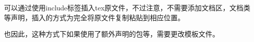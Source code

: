 
可以通过使用include标签插入tex原文件，不过注意，不需要添加文档区，文档类等声明，插入的方式为完全将原文件复制粘贴到相应位置。

也因此，这种方式下如果使用了额外声明的包等，需要更改模板文件。